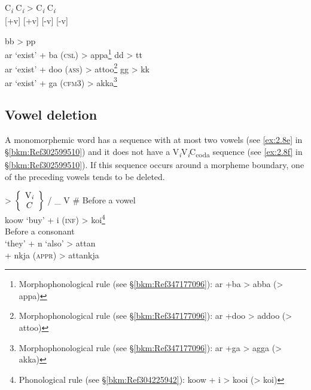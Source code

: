 \begin{exe}
\ex \gll C\textit{\textsubscript{i}}  C\textit{\textsubscript{i}}  >  C\textit{\textsubscript{i}}  C\textit{\textsubscript{i}}\footnotemark\\
 {[+v]}  [+v] {}   [-v]  [-v]\\
\ex\label{ex:2.20}
\begin{xlist}
\ex bb > pp\\
    ar   ‘exist’   +   ba   (\textsc{csl})   >   appa\footnote{Morphophonological rule (see §\ref{bkm:Ref347177096}): ar +ba > abba (> appa)}
\ex dd > tt\\
    ar   ‘exist’   +   doo   (\textsc{ass})   >   attoo\footnote{Morphophonological rule (see §\ref{bkm:Ref347177096}): ar +doo > addoo (> attoo)}
\ex gg > kk\\
    ar   ‘exist’   +   ga   (\textsc{cfm}3)   >   akka\footnote{Morphophonological rule (see §\ref{bkm:Ref347177096}): ar +ga > agga (> akka)}\\
\end{xlist}
\end{exe}

\subsection{Vowel deletion}
\label{bkm:Ref301832441}\hypertarget{RefHeadingToc395696982}{}
A monomorphemic word has a sequence with at most two vowels (see \ref{ex:2.8e} in §\ref{bkm:Ref302599510}) and it does not have a V\textit{\textsubscript{i}}V\textit{\textsubscript{i}}C\textsubscript{coda} sequence (see \ref{ex:2.8f} in §\ref{bkm:Ref302599510}). If this sequence occurs around a morpheme boundary, one of the preceding vowels tends to be deleted.

  {>}  $\left\{\begin{array}{c} \text{V\textit{\textsubscript{i}}} \\ C \end{array}  \right\}$  {/}  {\_} V    {\#}
\ex
\ea Before a vowel\\
   {koow}  {‘buy’}  {+}  {i}  {(\textsc{inf})}  {>}  {koi\footnote{Phonological rule (see §\ref{bkm:Ref304225942}): koow + i > kooi (> koi)}}\\
\ex Before a consonant\\
     {‘they’}  {+}  {n}    {‘also’}   {>}  {attan}\\
        {}         {}      {+}  {nkja}  {(\textsc{appr})}  {>}  {attankja}\\
\z
\z

